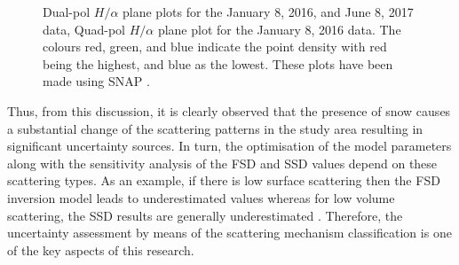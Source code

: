 \documentclass[review]{elsarticle}
\numberwithin{equation}{section}
\numberwithin{figure}{section}
\numberwithin{table}{section}
\begin{document}
\begin{figure}[htb]
\begin{subfigure}[t]{0.49\textwidth}
        \caption{}
        \label{subfig:ha_jan_quad}
    \end{subfigure}
    \caption{Dual-pol $H/{\alpha}$ plane plots for the  January 8, 2016, and  June 8, 2017 data,  Quad-pol $H/{\alpha}$ plane plot for the January 8, 2016 data. The colours red, green, and blue indicate the point density with red being the highest, and blue as the lowest. These plots have been made using SNAP \citep{ESA2018}.}
    \label{fig:ha_res}
\end{figure}

Thus, from this discussion, it is clearly observed that the presence of snow causes a substantial change of the scattering patterns in the study area resulting in significant uncertainty sources. In turn, the optimisation of the model parameters along with the sensitivity analysis of the FSD and SSD values depend on these scattering types. As an example, if there is low surface scattering then the FSD inversion model leads to underestimated values \citep{Leinss2014} whereas for low volume scattering, the SSD results are generally underestimated \citep{Cloude2005, Hajnsek2009, Kugler2015}. Therefore, the uncertainty assessment by means of the scattering mechanism classification is one of the key aspects of this research.
\end{document}
